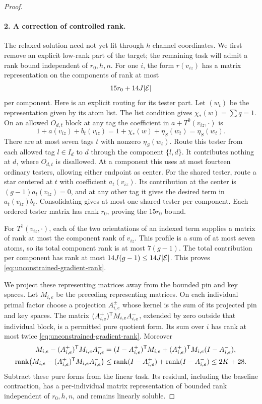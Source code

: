 \begin{proof}
\paragraph{2. A correction of controlled rank.}
The relaxed solution need not yet fit through $h$ channel
coordinates.  We first remove an explicit low-rank part of the
target; the remaining task will admit a rank bound independent
of $r_0,h,n$.
For one $i$, the form $r(v_{iz})$ has a matrix representation
on the components of rank at most
\begin{equation}\label{eq:unconstrained-gradient-rank}
 15r_0+14J|\mathcal E|
\end{equation}
per component.  Here is an explicit routing for its tester
part.  Let $(w_t)$ be the representation given by its atom
list.  The list condition gives $\chi_*(w)=\sum q=1$.
On an allowed $O_{d,t}$ block at any tag the coefficient in
$a+T^0(v_{iz},\cdot)$ is
\[
 1+a(v_{iz})+b_t(v_{iz})
 =1+\chi_*(w)+\eta_S(w_t)=\eta_S(w_t).
\]
There are at most seven tags $t$ with nonzero $\eta_S(w_t)$.
Route this tester from each allowed tag $l\in I_d$ to $d$
through the component $\{l,d\}$.  It contributes nothing at
$d$, where $O_{d,t}$ is disallowed.  At a component this uses
at most fourteen ordinary testers, allowing either endpoint
as center.  For the shared tester, route a star centered at
$t$ with coefficient $a_t(v_{iz})$.  Its contribution at the
center is $(g-1)a_t(v_{iz})=0$, and at any other tag it gives
the desired term in $a_t(v_{iz})b_t$.  Consolidating gives at
most one shared tester per component.  Each ordered tester
matrix has rank $r_0$, proving the $15r_0$ bound.

For $T^1(v_{iz},\cdot)$, each of the two orientations of an
indexed term supplies a matrix of rank at most the component
rank of $v_{iz}$.  This profile is a sum of at most seven
atoms, so its total component rank is at most $7(g-1)$.
The total contribution per component has rank at most
$14J(g-1)\le14J|\mathcal E|$.  This proves
\eqref{eq:unconstrained-gradient-rank}.

We project these representing matrices away from the bounded
pin and key spaces.
Let $M_{i,e}$ be the preceding representing matrices.  On each
individual primal factor choose a projection $A_{i,e}^{\pm}$
whose kernel is the sum of its projected pin and key spaces.
The matrix
$(A_{i,e}^+)^{\mathsf T} M_{i,e}A_{i,e}^-$, extended by zero outside
that individual block, is a permitted pure quotient form.
Its sum over $i$ has rank at most twice
\eqref{eq:unconstrained-gradient-rank}.  Moreover
\begin{align}\label{eq:bounded-rank-removal}
 M_{i,e}-(A_{i,e}^+)^{\mathsf T} M_{i,e}A_{i,e}^-
 &= (I-A_{i,e}^+)^{\mathsf T} M_{i,e}
       +(A_{i,e}^+)^{\mathsf T} M_{i,e}(I-A_{i,e}^-),\\
 \operatorname{rank}\bigl(M_{i,e}-(A_{i,e}^+)^{\mathsf T} M_{i,e}A_{i,e}^-\bigr)
 &\le \operatorname{rank}(I-A_{i,e}^+)+\operatorname{rank}(I-A_{i,e}^-)
 \le 2K+28.\notag
\end{align}
Subtract these pure forms from the linear task.  Its residual,
including the baseline contraction, has a per-individual
matrix representation of bounded rank independent of
$r_0,h,n$, and remains linearly soluble.


\end{proof}
